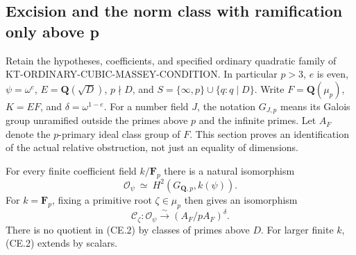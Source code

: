\subsection{Excision and the norm class with ramification only above p}
\label{sec:kt-cubic-excision-norm}

Retain the hypotheses, coefficients, and specified ordinary quadratic
family of KT-ORDINARY-CUBIC-MASSEY-CONDITION.  In particular \(p>3\),
\(e\) is even, \(\psi=\omega^e\), \(E=\mathbf Q(\sqrt D)\),
\(p\nmid D\), and
\(S=\{\infty,p\}\cup\{q:q\mid D\}\).
Write \(F=\mathbf Q(\mu_p)\), \(K=EF\), and
\(\delta=\omega^{1-e}\).  For a number field \(J\), the notation
\(G_{J,p}\) means its Galois group unramified outside the primes above
\(p\) and the infinite primes.  Let \(A_F\) denote the \(p\)-primary
ideal class group of \(F\).  This section proves an identification of
the actual relative obstruction, not just an equality of dimensions.

\begin{theorem}
For every finite coefficient field \(k/\mathbf F_p\) there is a
natural isomorphism
\[
 \mathcal O_\psi\ \simeq\ H^2(G_{\mathbf Q,p},k(\psi)).
                                                        \tag{CE.1}
\]
For \(k=\mathbf F_p\), fixing a primitive root \(\zeta\in\mu_p\)
then gives an isomorphism
\[
 \mathcal C_\zeta:\mathcal O_\psi
      \xrightarrow{\ \sim\ }(A_F/pA_F)^{\delta}.
                                                        \tag{CE.2}
\]
There is no quotient in (CE.2) by classes of primes above \(D\).
For larger finite \(k\), (CE.2) extends by scalars.
\end{theorem}

